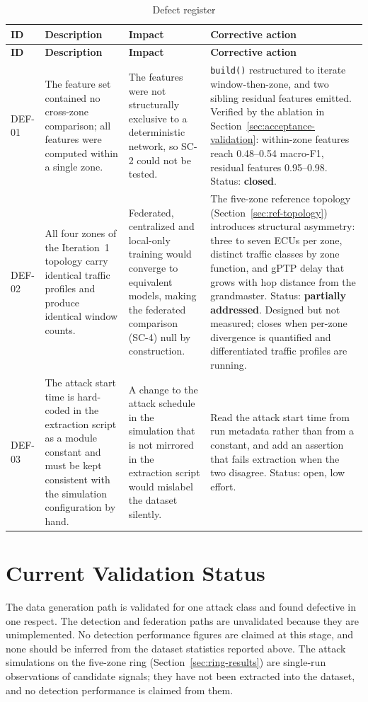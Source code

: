 \begin{longtable}{p{} p{} p{} p{}}
\caption{Defect register}\\
\toprule
\textbf{ID} & \textbf{Description} & \textbf{Impact} & \textbf{Corrective action} \\
\midrule
\endfirsthead
\toprule
\textbf{ID} & \textbf{Description} & \textbf{Impact} & \textbf{Corrective action} \\
\midrule
\endhead
DEF-01 & The feature set contained no cross-zone comparison; all features were
computed within a single zone. &
The features were not structurally exclusive to a deterministic network, so SC-2 could
not be tested. &
\texttt{build()} restructured to iterate window-then-zone, and two sibling residual
features emitted. Verified by the ablation in Section~\ref{sec:acceptance-validation}: within-zone features reach
0.48--0.54 macro-F1, residual features 0.95--0.98. Status: \textbf{closed}. \\
\addlinespace
DEF-02 & All four zones of the Iteration~1 topology carry identical traffic profiles
and produce identical window counts. &
Federated, centralized and local-only training would converge to equivalent models,
making the federated comparison (SC-4) null by construction. &
The five-zone reference topology (Section~\ref{sec:ref-topology}) introduces structural asymmetry: three
to seven ECUs per zone, distinct traffic classes by zone function, and gPTP delay that
grows with hop distance from the grandmaster. Status: \textbf{partially addressed}.
Designed but not measured; closes when per-zone divergence is quantified and
differentiated traffic profiles are running. \\
\addlinespace
DEF-03 & The attack start time is hard-coded in the extraction script as a module
constant and must be kept consistent with the simulation configuration by hand. &
A change to the attack schedule in the simulation that is not mirrored in the extraction
script would mislabel the dataset silently. &
Read the attack start time from run metadata rather than from a constant, and add an
assertion that fails extraction when the two disagree. Status: open, low effort. \\
\bottomrule
\end{longtable}

\section{Current Validation Status}

The data generation path is validated for one attack class and found defective in one
respect. The detection and federation paths are unvalidated because they are
unimplemented. No detection performance figures are claimed at this stage, and none
should be inferred from the dataset statistics reported above. The attack simulations on
the five-zone ring (Section~\ref{sec:ring-results}) are single-run observations of candidate
signals; they have not been extracted into the dataset, and no detection performance is
claimed from them.

